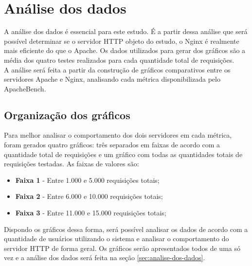 \chapter{Análise dos dados}\label{cap:analise-dos-dados}
A análise dos dados é essencial para este estudo. É a partir dessa análise que 
será possível determinar se o servidor HTTP objeto do estudo, o Nginx é 
realmente mais eficiente do que o Apache. Os dados utilizados para gerar dos 
gráficos são a média dos quatro testes realizados para cada quantidade total de 
requisições.\\
A análise será feita a partir da construção de gráficos comparativos entre os 
servidores Apache e Nginx, analisando cada métrica disponibilizada pelo 
ApacheBench.
\section{Organização dos gráficos}
Para melhor analisar o comportamento dos dois servidores em cada métrica, foram 
gerados quatro gráficos: três separados em faixas de 
acordo com a quantidade total de requisições e um gráfico com todas as 
quantidades totais de requisições testadas. As faixas de valores são:
\begin{itemize}
	\item \textbf{Faixa 1} - Entre 1.000 e 5.000 requisições totais;
	\item \textbf{Faixa 2} - Entre 6.000 e 10.000 requisições totais;
	\item \textbf{Faixa 3} - Entre 11.000 e 15.000 requisições totais;
\end{itemize}
Dispondo os gráficos dessa forma, será possível analisar os dados de acordo com 
a quantidade de usuários utilizando o sistema e analisar o comportamento do 
servidor HTTP de forma geral. Os gráficos serão apresentados todos de uma só 
vez e a análise dos dados será feita na seção \ref{sec:analise-dos-dados}.



